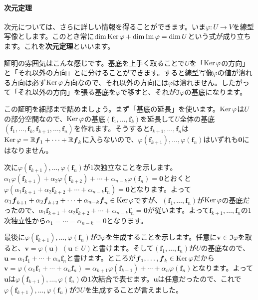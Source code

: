 \paragraph{次元定理}

次元については、さらに詳しい情報を得ることができます。いま$\varphi\colon U\rightarrow V$を線型写像とします。このとき常に$\dim \operatorname{Ker} \varphi + \dim \mathrm{Im}\, \varphi = \dim U$という式が成り立ちます。これを\textbf{次元定理}といいます。

証明の雰囲気はこんな感じです。基底を上手く取ることで$U$を「$\operatorname{Ker} \varphi$の方向」と「それ以外の方向」とに分けることができます。すると線型写像$\varphi$の値が潰れる方向は必ず$\operatorname{Ker} \varphi$方向なので、それ以外の方向には$\varphi$は潰れません。したがって「それ以外の方向」を張る基底を$\varphi$で移すと、それが$\Im \varphi$の基底になります。

この証明を細部まで詰めましょう。まず「基底の延長」を使います。$\operatorname{Ker} \varphi$は$U$の部分空間なので、$\operatorname{Ker}\varphi$の基底$(\bm{f}_1, \ldots, \bm{f}_k)$を延長して$U$全体の基底$(\bm{f}_1, \ldots, \bm{f}_k, \bm{f}_{k + 1}, \ldots, \bm{f}_n)$を作れます。そうすると$\bm{f}_{k + 1}, \ldots, \bm{f}_n$は$\operatorname{Ker} \varphi = \mathbb{R}\boldsymbol{f}_1 + \cdots + \mathbb{R}\boldsymbol{f}_k$に入らないので、$\varphi(\bm{f}_{k + 1}), \ldots, \varphi(\bm{f}_n)$はいずれも$\bm{0}$にはなりません。

次に$\varphi(\bm{f}_{k + 1}), \ldots, \varphi(\bm{f}_n)$が$1$次独立なことを示します。$\alpha_1 \varphi(\bm{f}_{k + 1}) + \alpha_2 \varphi(\bm{f}_{k + 2}) + \cdots + \alpha_{n - k}\varphi(\bm{f}_n) = \bm{0}$とおくと$\varphi(\alpha_1 \bm{f}_{k + 1} + \alpha_2 \bm{f}_{k + 2} + \cdots + \alpha_{n - k}\bm{f}_{n}) = \bm{0}$となります。よって$\alpha_1 \boldsymbol{f}_{k + 1} + \alpha_2 \boldsymbol{f}_{k + 2} + \cdots + \alpha_{n - k}\boldsymbol{f}_{n} \in \operatorname{Ker}\varphi$ですが、$(\bm{f}_1, \ldots, \bm{f}_n)$が$\operatorname{Ker}\varphi$の基底だったので、$\alpha_1 \bm{f}_{k + 1} + \alpha_2 \bm{f}_{k + 2} + \cdots + \alpha_{n - k}\bm{f}_{n} = \bm{0}$が従います。よって$\bm{f}_{k + 1}, \ldots, \bm{f}_{n}$の$1$次独立性から$\alpha_1 = \cdots = \alpha_{n - k} = 0$となります。

最後に$\varphi(\bm{f}_{k + 1}), \ldots, \varphi(\bm{f}_n)$が$\Im \varphi$を生成することを示します。任意に$\bm{v}\in \Im \varphi$を取ると、$\bm{v} = \varphi(\bm{u})$ $(\bm{u} \in U)$と書けます。そして$(\bm{f}_1, \ldots, \bm{f}_n)$が$U$の基底なので、$\bm{u} = \alpha_1 \bm{f}_1 + \cdots + \alpha_n \bm{f}_n$と書けます。ところが$\boldsymbol{f}_1, \ldots, \boldsymbol{f}_k \in \operatorname{Ker}\varphi$だから$\bm{v} = \varphi(\alpha_1 \bm{f}_1 + \cdots + \alpha_n \bm{f}_n) = \alpha_{k + 1} \varphi(\bm{f}_{k + 1}) + \cdots + \alpha_n \varphi(\bm{f}_n)$となります。よって$\bm{u}$は$\varphi(\bm{f}_{k + 1}), \ldots, \varphi(\bm{f}_n)$の$1$次結合で表せます。$\bm{u}$は任意だったので、これで$\varphi(\bm{f}_{k + 1}), \ldots, \varphi(\bm{f}_n)$が$\Im U$を生成することが言えました。

